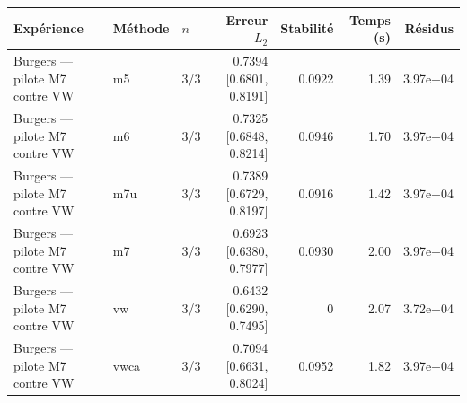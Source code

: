 \begin{tabular}{lllrrrr}
\toprule
Expérience & Méthode & $n$ & Erreur $L_2$ & Stabilité & Temps (s) & Résidus \\
\midrule
Burgers — pilote M7 contre VW & m5 & 3/3 & 0.7394 [0.6801, 0.8191] & 0.0922 & 1.39 & 3.97e+04 \\
Burgers — pilote M7 contre VW & m6 & 3/3 & 0.7325 [0.6848, 0.8214] & 0.0946 & 1.70 & 3.97e+04 \\
Burgers — pilote M7 contre VW & m7u & 3/3 & 0.7389 [0.6729, 0.8197] & 0.0916 & 1.42 & 3.97e+04 \\
Burgers — pilote M7 contre VW & m7 & 3/3 & 0.6923 [0.6380, 0.7977] & 0.0930 & 2.00 & 3.97e+04 \\
Burgers — pilote M7 contre VW & vw & 3/3 & 0.6432 [0.6290, 0.7495] & 0 & 2.07 & 3.72e+04 \\
Burgers — pilote M7 contre VW & vwca & 3/3 & 0.7094 [0.6631, 0.8024] & 0.0952 & 1.82 & 3.97e+04 \\
\bottomrule
\end{tabular}

